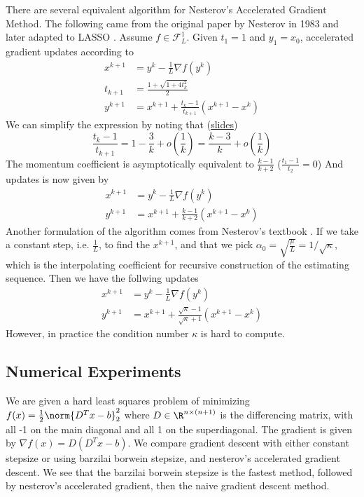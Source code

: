 \documentclass[11pt]{article}
\newcommand\scrF{\ensuremath{\mathscr{F}}}
\begin{document}
There are several equivalent algorithm for Nesterov's Accelerated Gradient Method. The following came from the original paper by Nesterov in 1983 \cite{nesterovMethodSolvingConvex1983} and later adapted to LASSO \cite{beckFastIterativeShrinkageThresholding2009a}. Assume $f\in \scrF_{L}^1$. Given $t_1 = 1$ and $y_1 = x_0$, accelerated gradient updates according to
\begin{align*}
    x^{k+1}
        &= y^k - \frac{1}{L} \nabla f(y^k) \\
    t_{k+1} 
        &= \frac{1 + \sqrt{1 + 4t_k^2} }{2} \\
    y^{k+1}
        &= x^{k+1} + \frac{t_k - 1}{t_{k+1}} \left( x^{k+1} - x^{k} \right)
\end{align*}
We can simplify the expression by noting that (\href{http://www.princeton.edu/~yc5/ele522_optimization/lectures/accelerated_gradient.pdf}{slides})
\[
    \frac{t_k - 1}{t_{k+1}} 
        = 1 - \frac{3}{k} + o(\frac{1}{k})
        = \frac{k-3}{k} + o(\frac{1}{k})
\]
The momentum coefficient is asymptotically equivalent to $\frac{k-1}{k+2}$ ($\frac{t_1-1}{t_{2}} = 0$)
And updates is now given by
\begin{align*}  
    x^{k+1} 
        &= y^k - \frac{1}{L} \nabla f(y^k) \\
    y^{k+1}
        &= x^{k+1} + \frac{k-1}{k+2} \left( x^{k+1} - x^k \right)
\end{align*}
Another formulation of the algorithm comes from Nesterov's textbook \cite{nesterovIntroductoryLecturesConvex2004}. If we take a constant step, i.e. $\frac{1}{L}$, to find the $x^{k+1}$, and that we pick $\alpha_0 = \sqrt{\frac{\mu}{L}} = 1/\sqrt{\kappa}$, which is the interpolating coefficient for recursive construction of the estimating sequence. Then we have the follwing updates
\begin{align*}
    x^{k+1} 
        &=  y^k - \frac{1}{L} \nabla f(y^k) \\
    y^{k+1}
        &= x^{k+1} + \frac{\sqrt{\kappa} - 1}{\sqrt{\kappa} + 1} (x^{k+1} - x^k)
\end{align*}
However, in practice the condition number $\kappa$ is hard to compute.


\subsection{Numerical Experiments}

We are given a hard least squares problem of minimizing $f(x) = \frac{1}{2}\norm{D^Tx-b}_2^2$ where $D\in\R^{n\times (n+1)}$ is the differencing matrix, with all -1 on the main diagonal and all 1 on the superdiagonal. The gradient is given by $\nabla f(x) = D(D^Tx-b)$. We compare gradient descent with either constant stepsize or using barzilai borwein stepsize, and nesterov's accelerated gradient descent.
We see that the barzilai borwein stepsize is the fastest method, followed by nesterov's accelerated gradient, then the naive gradient descent method.
\end{document}
